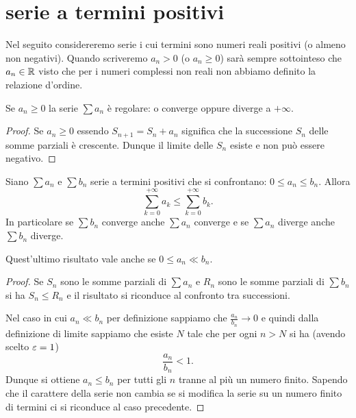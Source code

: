 \section{serie a termini positivi}

Nel seguito considereremo serie i cui termini sono numeri reali
positivi (o almeno non negativi).
Quando scriveremo $a_n >0$ (o $a_n \ge 0$) sarà sempre
sottointeso che $a_n\in {\mathbb R}$ visto che per i numeri complessi non
reali non abbiamo definito la relazione d'ordine.

\begin{theorem}\label{th:serie_positiva}
\mymark{***}%
%
%
Se $a_n\ge 0$
la serie $\sum a_n$ è regolare:
o converge oppure diverge a $+\infty$.
\end{theorem}
%
\begin{proof}
\mymark{***}
Se $a_n \ge 0$ essendo $S_{n+1} = S_n + a_n$ significa che
la successione $S_n$ delle somme parziali è crescente.
Dunque il limite delle $S_n$ esiste e non può essere negativo.
\end{proof}

\begin{theorem}
\mymark{**}
Siano $\sum a_n$ e $\sum b_n$ serie a
termini positivi che si confrontano: $0\le a_n\le b_n$.
Allora
\[
  \sum_{k=0}^{+\infty} a_k \le \sum_{k=0}^{+\infty} b_k.
\]
In particolare se $\sum b_n$ converge anche $\sum a_n$ converge
e se $\sum a_n$ diverge anche $\sum b_n$ diverge.

Quest'ultimo risultato vale anche se $0 \le a_n \ll b_n$.
\end{theorem}
%
\begin{proof}
\mymark{*}
Se $S_n$ sono le somme parziali di $\sum a_n$ e $R_n$ sono le somme
parziali di $\sum b_n$ si ha $S_n \le R_n$ e il risultato
si riconduce al confronto tra successioni.

Nel caso in cui $a_n \ll b_n$ per definizione sappiamo che $\frac{a_n}{b_n}\to 0$
e quindi dalla definizione di limite sappiamo che
esiste $N$ tale che per ogni $n>N$ si ha (avendo scelto $\varepsilon=1$)
\[
  \frac{a_n}{b_n} < 1.
\]
Dunque si ottiene $a_n \le b_n$ per tutti gli $n$ tranne al più un numero
finito. Sapendo che il carattere della serie non cambia se si modifica
la serie su un numero finito di termini ci si riconduce al caso precedente.
\end{proof}

